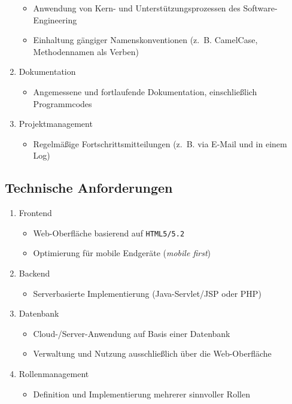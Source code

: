 \documentclass[%
	ngerman,
	12pt,
	a4paper
]{scrbook}
\begin{document}
\begin{enumerate}
\begin{itemize}
			\item Anwendung von Kern- und Unterstützungsprozessen des Software-Engineering
			\item Einhaltung gängiger Namenskonventionen (z.~B. CamelCase, Methodennamen als Verben)
		\end{itemize}
		\item Dokumentation
		\begin{itemize}
			\item Angemessene und fortlaufende Dokumentation, einschließlich Programmcodes
		\end{itemize}
		\item Projektmanagement
		\begin{itemize}
			\item Regelmäßige Fortschrittsmitteilungen (z.~B. via E-Mail und in einem Log)
		\end{itemize}
	\end{enumerate}
	\subsection{Technische Anforderungen}
	\begin{enumerate}
		\item Frontend
		\begin{itemize}
			\item Web-Oberfläche basierend auf \texttt{HTML5/5.2}
			\item Optimierung für mobile Endgeräte (\textit{mobile first})
		\end{itemize}
		\item Backend
		\begin{itemize}
			\item Serverbasierte Implementierung (Java-Servlet/JSP oder PHP)
		\end{itemize}
		\item Datenbank
		\begin{itemize}
			\item Cloud-/Server-Anwendung auf Basis einer Datenbank
			\item Verwaltung und Nutzung ausschließlich über die Web-Oberfläche
		\end{itemize}
		\item Rollenmanagement
		\begin{itemize}
			\item Definition und Implementierung mehrerer sinnvoller Rollen
		\end{itemize}
	\end{enumerate}
\end{document}
